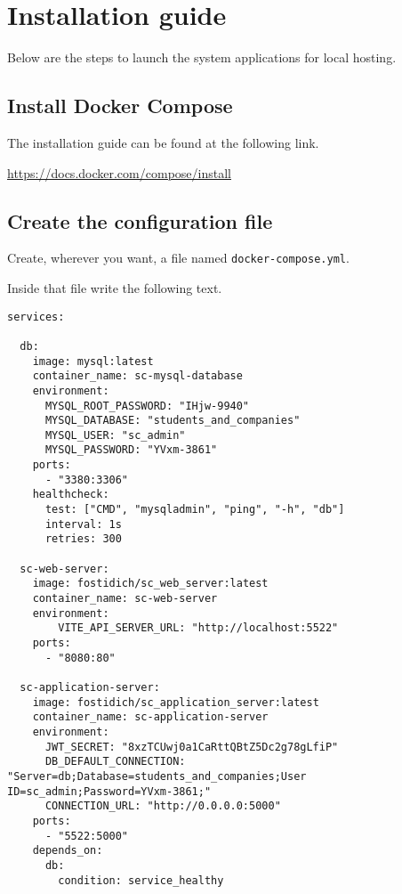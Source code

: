 \chapter{Installation guide}

Below are the steps to launch the system applications for local hosting.

\section{Install Docker Compose}

The installation guide can be found at the following link.

\begin{center}
\url{https://docs.docker.com/compose/install}
\end{center}

\section{Create the configuration file}

Create, wherever you want, a file named \verb|docker-compose.yml|.

Inside that file write the following text.

\fontsize{7pt}{7pt}\selectfont
\begin{verbatim}
services:

  db:
    image: mysql:latest
    container_name: sc-mysql-database
    environment:
      MYSQL_ROOT_PASSWORD: "IHjw-9940"
      MYSQL_DATABASE: "students_and_companies"
      MYSQL_USER: "sc_admin"
      MYSQL_PASSWORD: "YVxm-3861"
    ports:
      - "3380:3306"
    healthcheck:
      test: ["CMD", "mysqladmin", "ping", "-h", "db"]
      interval: 1s
      retries: 300

  sc-web-server:
    image: fostidich/sc_web_server:latest
    container_name: sc-web-server
    environment:
        VITE_API_SERVER_URL: "http://localhost:5522"
    ports:
      - "8080:80"

  sc-application-server:
    image: fostidich/sc_application_server:latest
    container_name: sc-application-server
    environment:
      JWT_SECRET: "8xzTCUwj0a1CaRttQBtZ5Dc2g78gLfiP"
      DB_DEFAULT_CONNECTION: "Server=db;Database=students_and_companies;User ID=sc_admin;Password=YVxm-3861;"
      CONNECTION_URL: "http://0.0.0.0:5000"
    ports:
      - "5522:5000"
    depends_on:
      db:
        condition: service_healthy
\end{verbatim}
\normalsize

